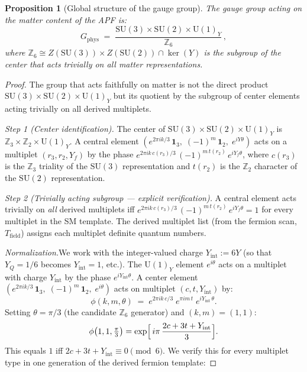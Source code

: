 \documentclass[11pt]{article}
\newtheorem{proposition}[theorem]{Proposition}
\theoremstyle{definition}
\newcommand{\SU}{\mathrm{SU}}
\newcommand{\U}{\mathrm{U}}
\begin{document}
\begin{proposition}[Global structure of the gauge group]%
\label{prop:global_structure}\label{prop:global_Z6}
The gauge group acting on the matter content of the APF is:
\[
  G_{\mathrm{phys}} \;=\;
  \frac{\SU(3) \times \SU(2) \times \U(1)_Y}{\mathbb{Z}_6}\,,
\]
where $\mathbb{Z}_6 \cong Z(\SU(3)) \times Z(\SU(2)) \cap \ker(Y)$
is the subgroup of the center that acts trivially on all matter
representations.
\end{proposition}

\begin{proof}
The group that acts faithfully on matter is not the direct product
$\SU(3) \times \SU(2) \times \U(1)_Y$ but its quotient by the
subgroup of center elements acting trivially on all derived multiplets.

\textit{Step 1 (Center identification).}\quad
The center of $\SU(3) \times \SU(2) \times \U(1)_Y$ is
$\mathbb{Z}_3 \times \mathbb{Z}_2 \times \U(1)_Y$.  A central element
$(e^{2\pi i k/3}\,\mathbf{1}_3,\; (-1)^m\,\mathbf{1}_2,\;
e^{iY\theta})$ acts on a multiplet $(r_3, r_2, Y_f)$ by the phase
$e^{2\pi i k\, c(r_3)/3}\, (-1)^{m\, t(r_2)}\, e^{iY_f\theta}$,
where $c(r_3)$ is the $\mathbb{Z}_3$ triality of the $\SU(3)$
representation and $t(r_2)$ is the $\mathbb{Z}_2$ character of the
$\SU(2)$ representation.

\textit{Step 2 (Trivially acting subgroup --- explicit verification).}\quad
A central element acts trivially on \emph{all} derived multiplets iff
$e^{2\pi i k\, c(r_3)/3}\, (-1)^{m\, t(r_2)}\, e^{iY_f\theta} = 1$
for every multiplet in the SM template.  The derived multiplet list
(from the fermion scan, $T_{\mathrm{field}}$) assigns each multiplet
definite quantum numbers.

\textit{Normalization.}\quad We work with the integer-valued charge
$Y_{\mathrm{int}} := 6Y$ (so that $Y_Q = 1/6$ becomes
$Y_{\mathrm{int}} = 1$, etc.).  The $\U(1)_Y$ element $e^{i\theta}$
acts on a multiplet with charge $Y_{\mathrm{int}}$ by the phase
$e^{iY_{\mathrm{int}}\theta}$.  A center element
$(e^{2\pi i k/3}\,\mathbf{1}_3,\; (-1)^m\,\mathbf{1}_2,\;
e^{i\theta})$ acts on multiplet $(c, t, Y_{\mathrm{int}})$ by:
\begin{equation}\label{eq:center_phase}
  \phi(k,m,\theta) \;=\; e^{2\pi i k\, c/3}\;
  e^{\pi i m\, t}\; e^{i Y_{\mathrm{int}}\,\theta}.
\end{equation}
Setting $\theta = \pi/3$ (the candidate $\mathbb{Z}_6$ generator)
and $(k, m) = (1, 1)$:
\[
  \phi\bigl(1,1,\tfrac{\pi}{3}\bigr) = \exp\Bigl[\,
  i\pi\,\frac{2c + 3t + Y_{\mathrm{int}}}{3}\Bigr].
\]
This equals $1$ iff $2c + 3t + Y_{\mathrm{int}} \equiv 0 \pmod{6}$.
We verify this for every multiplet type in one generation of the
derived fermion template:


\end{proof}
\end{document}
